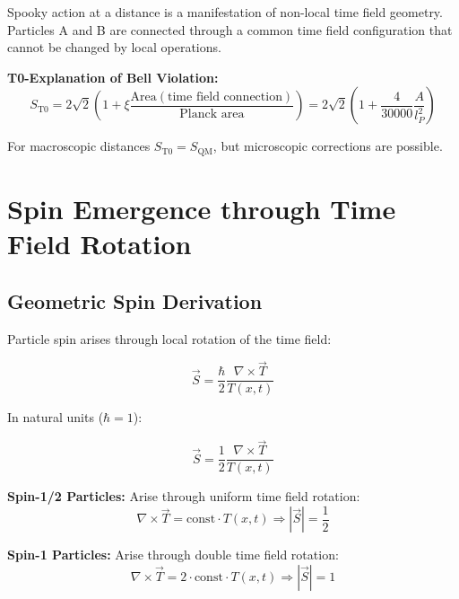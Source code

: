 \documentclass[12pt,a4paper]{report}
\newcommand{\Tfield}{T(x,t)}  %
\newcommand{\xipar}{\xi}      %
\begin{document}
	Spooky action at a distance is a manifestation of non-local time field geometry. Particles A and B are connected through a common time field configuration that cannot be changed by local operations.
	
	\textbf{T0-Explanation of Bell Violation:}
	\begin{equation}\label{eq:bell_t0}
		S_{\text{T0}} = 2\sqrt{2} \left(1 + \xipar \frac{\text{Area}(\text{time field connection})}{\text{Planck area}}\right) = 2\sqrt{2} \left(1 + \frac{4}{30000} \frac{A}{l_P^2}\right)
	\end{equation}
	
	For macroscopic distances $S_{\text{T0}} = S_{\text{QM}}$, but microscopic corrections are possible.
	
	\section{Spin Emergence through Time Field Rotation}\label{sec:spin_emergence}
	
	\subsection{Geometric Spin Derivation}\label{subsec:geometric_spin_derivation}
	
	Particle spin arises through local rotation of the time field:
	
	\begin{equation}\label{eq:spin_timefield}
		\vec{S} = \frac{\hbar}{2} \frac{\nabla \times \vec{T}}{\Tfield}
	\end{equation}
	
	In natural units ($\hbar = 1$):
	
	\begin{equation}\label{eq:spin_timefield_nat}
		\vec{S} = \frac{1}{2} \frac{\nabla \times \vec{T}}{\Tfield}
	\end{equation}
	
	\textbf{Spin-1/2 Particles:}
	Arise through uniform time field rotation:
	\begin{equation}
		\nabla \times \vec{T} = \text{const} \cdot \Tfield \Rightarrow |\vec{S}| = \frac{1}{2}
	\end{equation}
	
	\textbf{Spin-1 Particles:}
	Arise through double time field rotation:
	\begin{equation}
		\nabla \times \vec{T} = 2 \cdot \text{const} \cdot \Tfield \Rightarrow |\vec{S}| = 1
	\end{equation}
	
\end{document}
